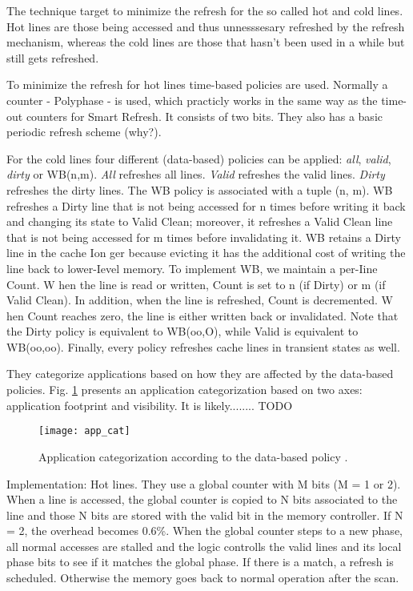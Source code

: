 The technique target to minimize the refresh for the so called hot and cold lines. Hot lines are those being accessed and thus unnesssesary refreshed by the refresh mechanism, whereas the cold lines are those that hasn't been used in a while but still gets refreshed.

To minimize the refresh for hot lines time-based policies are used. Normally a counter - Polyphase - is used, which practicly works in the same way as the time-out counters for Smart Refresh. It consists of two bits. They also has a basic periodic refresh scheme (why?).

For the cold lines four different (data-based) policies can be applied: \textit{all}, \textit{valid}, \textit{dirty} or WB(n,m). \textit{All} refreshes all lines. \textit{Valid} refreshes the valid lines. \textit{Dirty} refreshes the dirty lines. The WB policy is associated with a tuple (n, m). WB refreshes a Dirty line that is not being accessed for n times before writing it back and changing its state to Valid Clean; moreover, it refreshes a Valid Clean line that is not being accessed for m times before invalidating it. WB retains a Dirty line in the cache Ion ger because evicting it has the additional cost of writing the line back to lower-Ievel memory. To implement WB, we maintain a per-Iine Count. W hen the line is read or written, Count is set to n (if Dirty) or m (if Valid Clean). In addition, when the line is refreshed, Count is decremented. W hen Count reaches zero, the line is either written back or invalidated. Note that the Dirty policy is equivalent to WB(oo,O), while Valid is equivalent to WB(oo,oo). Finally, every policy refreshes cache lines in transient states as well.

They categorize applications based on how they are affected by the data-based policies. Fig. \ref{fig:app_cat} presents an application categorization based on two axes: application footprint and visibility. It is likely........ TODO

\begin{figure}[t!]
	\texttt{[image: app\_cat]}
	\caption{Application categorization according to the data-based policy \cite{refrint}.}
	\label{fig:app_cat}
\end{figure}

Implementation: Hot lines. They use a global counter with M bits (M = 1 or 2). When a line is accessed, the global counter is copied to N bits associated to the line and those N bits are stored with the valid bit in the memory controller. If N = 2, the overhead becomes 0.6\%. When the global counter steps to a new phase, all normal accesses are stalled and the logic controlls the valid lines and its local phase bits to see if it matches the global phase. If there is a match, a refresh is scheduled. Otherwise the memory goes back to normal operation after the scan. 

